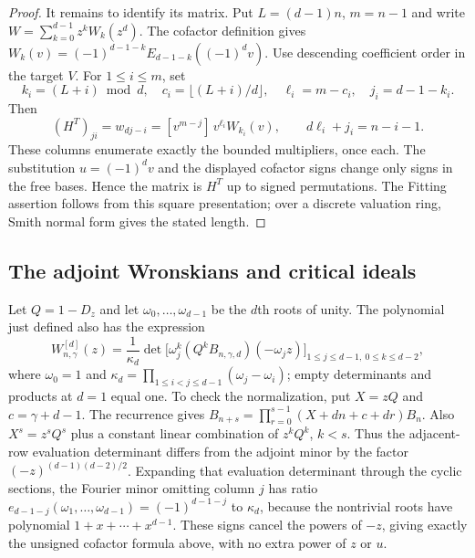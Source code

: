 \documentclass[11pt]{article}
\begin{document}
\begin{proof}
It remains to identify its matrix. Put $L=(d-1)n$, $m=n-1$ and
write $W=\sum_{k=0}^{d-1}z^kW_k(z^d)$. The cofactor definition gives
$W_k(v)=(-1)^{d-1-k}E_{d-1-k}((-1)^dv)$.
Use descending coefficient order in the target $V$.
For $1\le i\le m$, set
\[
 k_i=(L+i)\bmod d,\quad c_i=\lfloor(L+i)/d\rfloor,
 \quad\ell_i=m-c_i,\quad j_i=d-1-k_i.
\]
Then
\[
 (H^T)_{ji}=w_{dj-i}
 =[v^{m-j}]\,v^{\ell_i}W_{k_i}(v),\qquad
 d\ell_i+j_i=n-i-1.
\]
These columns enumerate exactly the bounded multipliers, once each.
The substitution $u=(-1)^dv$ and the displayed cofactor signs change
only signs in the free bases. Hence the matrix is $H^T$ up to signed
permutations. The Fitting assertion follows from this square
presentation; over a discrete valuation ring, Smith normal form
gives the stated length.
\end{proof}

\subsection*{The adjoint Wronskians and critical ideals}
Let $Q=1-D_z$ and let $\omega_0,\ldots,\omega_{d-1}$ be the $d$th
roots of unity. The polynomial just defined also has the expression
\[
 W^{[d]}_{n,\gamma}(z)=\frac1{\kappa_d}
  \det\bigl[\omega_j^k(Q^kB_{n,\gamma,d})(-\omega_jz)\bigr]
       _{1\le j\le d-1,\ 0\le k\le d-2},
\]
where $\omega_0=1$ and
$\kappa_d=\prod_{1\le i<j\le d-1}(\omega_j-\omega_i)$;
empty determinants and products at $d=1$ equal one.
To check the normalization, put $X=zQ$ and $c=\gamma+d-1$.
The recurrence gives
$B_{n+s}=\prod_{r=0}^{s-1}(X+dn+c+dr)B_n$.
Also $X^s=z^sQ^s$ plus a constant linear combination of
$z^kQ^k$, $k<s$.
Thus the adjacent-row evaluation determinant differs from the
adjoint minor by the factor $(-z)^{(d-1)(d-2)/2}$.
Expanding that evaluation determinant through the cyclic sections,
the Fourier minor omitting column $j$ has ratio
$e_{d-1-j}(\omega_1,\ldots,\omega_{d-1})=(-1)^{d-1-j}$ to
$\kappa_d$, because the nontrivial roots have polynomial
$1+x+\cdots+x^{d-1}$. These signs cancel the powers of $-z$,
giving exactly the unsigned cofactor formula above, with no extra
power of $z$ or $u$.
\end{document}
